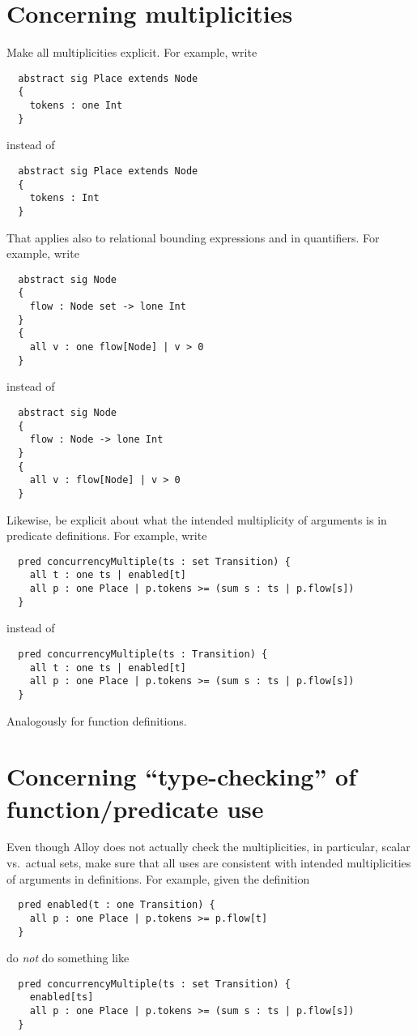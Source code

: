 \documentclass{article}
\begin{document}
\section*{Concerning multiplicities}

Make all multiplicities explicit.
For example, write
\begin{lstlisting}
  abstract sig Place extends Node
  {
    tokens : one Int
  }
\end{lstlisting}
instead of
\begin{lstlisting}
  abstract sig Place extends Node
  {
    tokens : Int
  }
\end{lstlisting}
That applies also to relational bounding expressions and in quantifiers.
For example, write
\begin{lstlisting}
  abstract sig Node
  {
    flow : Node set -> lone Int
  }
  {
    all v : one flow[Node] | v > 0
  }
\end{lstlisting}
instead of
\begin{lstlisting}
  abstract sig Node
  {
    flow : Node -> lone Int
  }
  {
    all v : flow[Node] | v > 0
  }
\end{lstlisting}
Likewise, be explicit about what the intended multiplicity of arguments is in predicate definitions.
For example, write
\begin{lstlisting}
  pred concurrencyMultiple(ts : set Transition) {
    all t : one ts | enabled[t]
    all p : one Place | p.tokens >= (sum s : ts | p.flow[s])
  }
\end{lstlisting}
instead of
\begin{lstlisting}
  pred concurrencyMultiple(ts : Transition) {
    all t : one ts | enabled[t]
    all p : one Place | p.tokens >= (sum s : ts | p.flow[s])
  }
\end{lstlisting}
Analogously for function definitions.

\section*{Concerning ``type-checking'' of function/predicate use}

Even though Alloy does not actually check the multiplicities, in particular, scalar vs.\ actual sets, make sure that all uses are consistent with intended multiplicities of arguments in definitions.
For example, given the definition
\begin{lstlisting}
  pred enabled(t : one Transition) {
    all p : one Place | p.tokens >= p.flow[t]
  }
\end{lstlisting}
do \emph{not} do something like
\begin{lstlisting}
  pred concurrencyMultiple(ts : set Transition) {
    enabled[ts]
    all p : one Place | p.tokens >= (sum s : ts | p.flow[s])
  }
\end{lstlisting}
\end{document}
